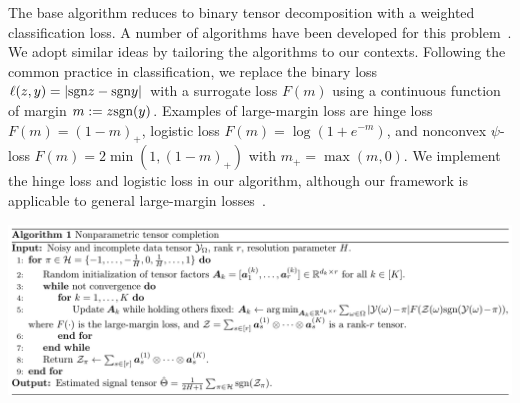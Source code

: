 \documentclass{article}
\theoremstyle{plain}
\theoremstyle{definition}
\def\sign{\textup{sgn}}
\begin{document}
The base algorithm reduces to binary tensor decomposition with a weighted classification loss. A number of algorithms have been developed for this problem~\citep{ghadermarzy2018learning,wang2018learning,hong2020generalized}. We adopt similar ideas by tailoring the algorithms to our contexts. Following the common practice in classification, we replace the binary loss $\ell(z,y)=|\sign z - \sign y|$ with a surrogate loss $F(m)$ using a continuous function of margin $m:=z\sign(y)$. Examples of large-margin loss are hinge loss $F(m) = (1-m)_+$, logistic loss $F(m) =\log(1+e^{-m})$, and nonconvex $\psi$-loss $F(m)=2\min(1,(1-m)_+)$ with $m_{+}=\max(m,0)$. We implement the hinge loss and logistic loss in our algorithm, although our framework is applicable to general large-margin losses~\citep{bartlett2006convexity}. 



\includegraphics[width=\textwidth]{figure/algorithm.pdf}
\label{alg:tensorT}
\end{document}
